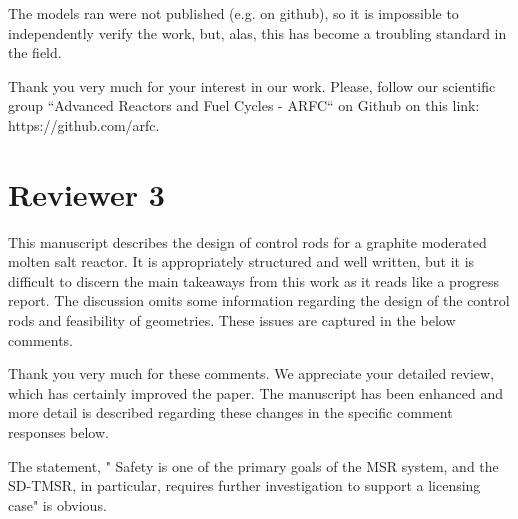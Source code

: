 \documentclass[answers,11pt]{exam}
\begin{document}
\begin{questions}
\begin{solution}
        \end{solution}


        \question The models ran were not published (e.g. on github), so it is impossible to independently verify the work, but, alas, this has become a troubling standard in the field.
        
        \begin{solution}
                 Thank you very much for your interest in our work. Please, follow our scientific group ``Advanced Reactors and Fuel Cycles -
                 ARFC`` on Github on this link: https://github.com/arfc.   

                 
        \end{solution}

      
\section*{Reviewer 3}
        \question This manuscript describes the design of control rods for a graphite moderated molten salt reactor. It is appropriately structured and well written, but it is difficult to discern the main takeaways from this work as it reads like a progress report. The discussion omits some information regarding the design of the control rods and feasibility of geometries. These issues are captured in the below comments.
        
        \begin{solution}
        	 Thank you very much for these comments. We appreciate your detailed review, which has certainly improved the paper. The manuscript has been enhanced and more detail is described regarding these changes in the specific comment responses below.
        	

        \end{solution}

        \question  The statement, " Safety is one of the primary goals of the MSR system, and the SD-TMSR, in particular, requires further investigation to support a licensing case" is obvious.
        
        \begin{solution}
             

\end{solution}
\end{questions}
\end{document}
